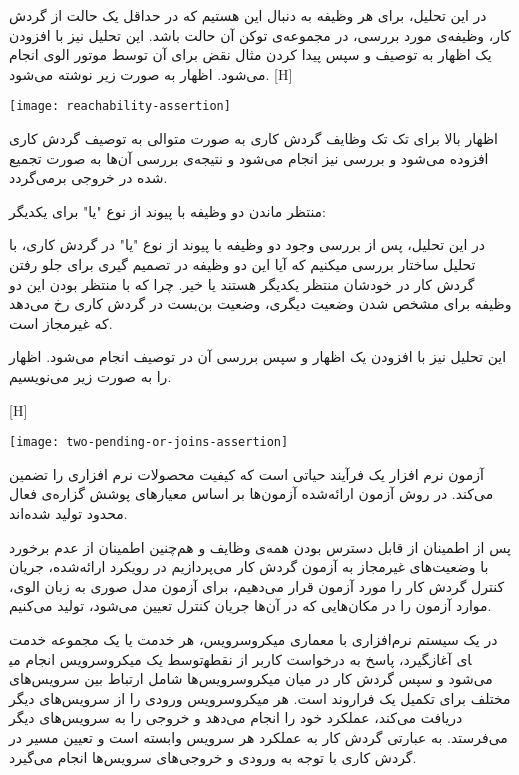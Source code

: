 در این تحلیل، برای هر وظیفه به دنبال این هستیم که در حداقل یک حالت‌ از گردش کار، وظیفه‌ی مورد بررسی، در مجموعه‌ی توکن آن حالت باشد. این تحلیل نیز با افزودن یک اظهار به توصیف و سپس پیدا کردن مثال نقض برای آن توسط موتور الوی انجام‌ می‌شود. اظهار به صورت زیر نوشته می‌شود. 
[H]
\raggedright
\texttt{[image: reachability-assertion]}
\vspace{0.5em}

اظهار بالا برای تک تک وظایف گردش کاری به صورت متوالی به توصیف گردش کاری افزوده می‌شود و بررسی نیز انجام می‌شود و نتیجه‌ی بررسی آن‌ها به صورت تجمیع شده در خروجی برمی‌گردد.



 منتظر ماندن دو وظیفه با پیوند از نوع "یا" برای یکدیگر:

در این تحلیل، پس از بررسی وجود دو وظیفه با پیوند از نوع "یا" در گردش کاری، با تحلیل ساختار بررسی میکنیم که آیا این دو وظیفه در تصمیم گیری برای جلو رفتن گردش کار در خودشان منتظر یکدیگر هستند یا خیر. چرا که با منتظر بودن این دو وظیفه برای مشخص شدن وضعیت دیگری، وضعیت بن‌بست در گردش کاری رخ می‌دهد که غیرمجاز است.

 این تحلیل نیز با افزودن یک اظهار و سپس بررسی آن در توصیف انجام‌ می‌شود. اظهار را به صورت زیر می‌نویسیم. 
 
 
 
[H]
\raggedright
\texttt{[image: two-pending-or-joins-assertion]}
\vspace{0.5em}








آزمون نرم افزار یک فرآیند حیاتی است که کیفیت محصولات نرم افزاری را تضمین می‌کند. در روش آزمون ارائه‌شده آزمون‌ها بر اساس معیارهای پوشش گزاره‌ی فعال محدود تولید شده‌اند.

پس از اطمینان از قابل دسترس بودن همه‌ی وظایف و هم‌چنین اطمینان از عدم برخورد با وضعیت‌های غیرمجاز به آزمون گردش‌ کار می‌پردازیم در رویکرد ارائه‌شده، جریان کنترل گردش کار را مورد آزمون قرار می‌دهیم، برای آزمون مدل صوری به زبان الوی، موارد آزمون را در مکان‌هایی که در آن‌ها جریان کنترل تعیین می‌شود، تولید می‌کنیم. 

در یک سیستم نرم‌افزاری با معماری میکروسرویس، هر خدمت یا یک مجموعه خدمت توسط یک میکروسرویس انجام می‎گیرد، پاسخ به درخواست کاربر از نقطه‎ای آغاز می‌شود و سپس گردش کار در میان میکروسرویس‌ها شامل ارتباط بین سرویس‌های مختلف برای تکمیل یک فراروند است. هر میکروسرویس ورودی را از سرویس‌های دیگر دریافت می‌کند، عملکرد خود را انجام می‌دهد و خروجی را به سرویس‌های دیگر می‌فرستد. به عبارتی گردش کار به عملکرد هر سرویس وابسته است و تعیین مسیر در گردش کاری با توجه به ورودی و خروجی‌های سرویس‌ها انجام می‌گیرد. 

